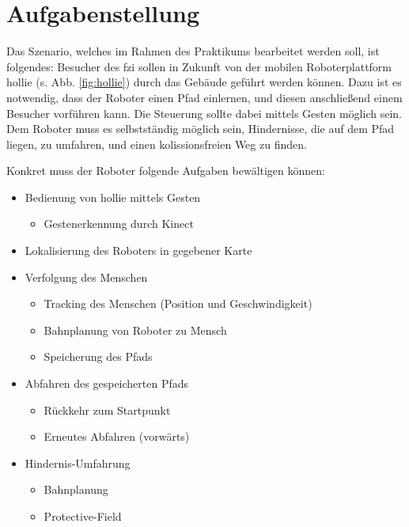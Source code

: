 \section{Aufgabenstellung}
\label{einleitung_aufgabenstellung_sec}
\authorsection{\editorjulian, \editortobias}

Das Szenario, welches im Rahmen des Praktikums bearbeitet werden soll, ist folgendes:
Besucher des \gls{fzi} sollen in Zukunft von der mobilen Roboterplattform \gls{hollie} (s. Abb. \ref{fig:hollie}) durch das Gebäude geführt werden können.
Dazu ist es notwendig, dass der Roboter einen Pfad einlernen, und diesen anschließend einem Besucher vorführen kann.
Die Steuerung sollte dabei mittels Gesten möglich sein.
Dem Roboter muss es selbstständig möglich sein, Hindernisse, die auf dem Pfad liegen, zu umfahren, und einen kolissionsfreien Weg zu finden.


Konkret muss der Roboter folgende Aufgaben bewältigen können:

\begin{itemize}
  \item Bedienung von \gls{hollie} mittels Gesten
	\begin{itemize}
	\item Gestenerkennung durch Kinect
	\end{itemize}
  \item Lokalisierung des Roboters in gegebener Karte
  \item Verfolgung des Menschen
	\begin{itemize}
	  \item Tracking des Menschen (Position und Geschwindigkeit)
	  \item Bahnplanung von Roboter zu Mensch
	  \item Speicherung des Pfads
	\end{itemize}
  \item Abfahren des gespeicherten Pfads
	\begin{itemize}
	  \item Rückkehr zum Startpunkt
	  \item Erneutes Abfahren (vorwärts)
	\end{itemize}
  \item Hindernis-Umfahrung
	\begin{itemize}
	  \item Bahnplanung
	  \item Protective-Field
	\end{itemize}
\end{itemize}

